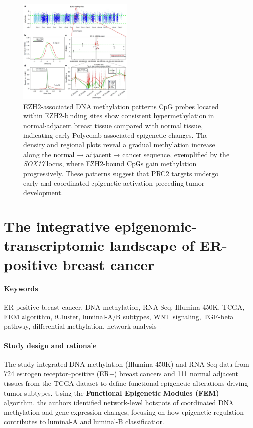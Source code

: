 \documentclass[10pt]{extarticle}
\begin{document}
\begin{figure}[H]
    \centering
    \includegraphics[width=0.5\textwidth]{Figures/Enrichment of EZH2 TF-binding sites among DNA methylation field defects..jpg} %
    \caption{EZH2-associated DNA methylation patterns
CpG probes located within EZH2-binding sites show consistent hypermethylation in normal-adjacent breast tissue compared with normal tissue, indicating early Polycomb-associated epigenetic changes. The density and regional plots reveal a gradual methylation increase along the normal → adjacent → cancer sequence, exemplified by the \textit{SOX17} locus, where EZH2-bound CpGs gain methylation progressively. These patterns suggest that PRC2 targets undergo early and coordinated epigenetic activation preceding tumor development.}
    \label{fig:DNA_methylation_patters}
\end{figure}


\section{The integrative epigenomic-transcriptomic landscape of ER-positive breast cancer}

\paragraph{Keywords}
ER-positive breast cancer, DNA methylation, RNA-Seq, Illumina 450K, TCGA, FEM algorithm, iCluster, luminal-A/B subtypes, WNT signaling, TGF-beta pathway, differential methylation, network analysis~\cite{gao2015integrative}.

\paragraph{Study design and rationale}
The study integrated DNA methylation (Illumina 450K) and RNA-Seq data from 724 estrogen receptor–positive (ER+) breast cancers and 111 normal adjacent tissues from the TCGA dataset to define functional epigenetic alterations driving tumor subtypes. Using the \textbf{Functional Epigenetic Modules (FEM)} algorithm, the authors identified network-level hotspots of coordinated DNA methylation and gene-expression changes, focusing on how epigenetic regulation contributes to luminal-A and luminal-B classification.
\end{document}
